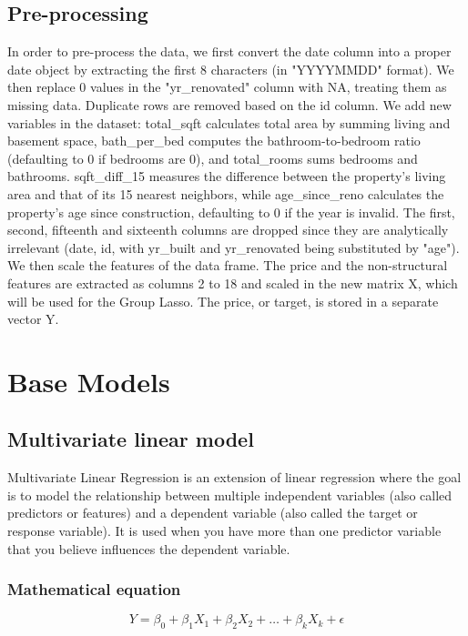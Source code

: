 \documentclass[a4paper, 9pt]{article}
\begin{document}
\begin{multicols}{2}
\subsection{Pre-processing} \vspace{-3pt}
In order to pre-process the data, we first convert the date column into a proper date object by extracting the first 8 characters (in "YYYYMMDD" format). We then replace 0 values in the "yr{\_}renovated" column with NA, treating them as missing data. Duplicate rows are removed based on the id column.
We add new variables in the dataset: total{\_}sqft calculates total area by summing living and basement space, bath{\_}per{\_}bed computes the bathroom-to-bedroom ratio (defaulting to 0 if bedrooms are 0), and total{\_}rooms sums bedrooms and bathrooms. sqft{\_}diff{\_}15 measures the difference between the property’s living area and that of its 15 nearest neighbors, while age{\_}since{\_}reno calculates the property’s age since construction, defaulting to 0 if the year is invalid.
The first, second, fifteenth and sixteenth columns are dropped since they are analytically irrelevant (date, id, with yr{\_}built and yr{\_}renovated being substituted by "age"). We then scale the features of the data frame.
The price and the non-structural features are extracted as columns 2 to 18 and scaled in the new matrix X, which will be used for the Group Lasso. The price, or target, is stored in a separate vector Y.

\section{Base Models} \vspace{-7pt}
\subsection{Multivariate linear model} \vspace{-3pt}
Multivariate Linear Regression is an extension of linear regression where the goal is to model the relationship between multiple independent variables (also called predictors or features) and a dependent variable (also called the target or response variable). It is used when you have more than one predictor variable that you believe influences the dependent variable.

\subsubsection*{Mathematical equation}
\begin{equation}
Y=\beta_0+\beta_1X_1+\beta_2X_2+\dots+\beta_kX_k+\epsilon
\end{equation}


\end{multicols}
\end{document}
